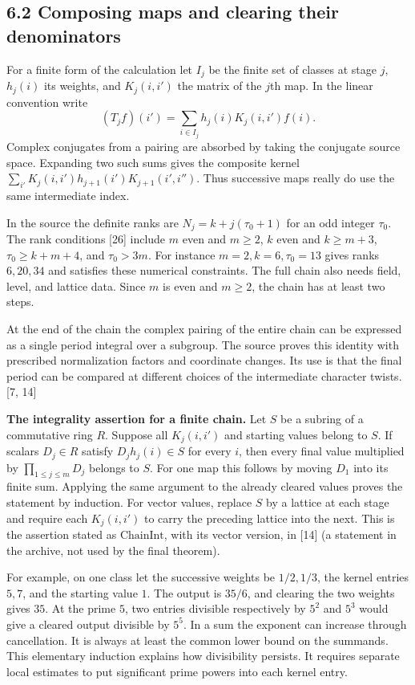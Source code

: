 \documentclass[11pt,letterpaper]{article}
\begin{document}
{\newpage
\subsection*{6.2 Composing maps and clearing their denominators}

For a finite form of the calculation let $I_j$ be the finite set of classes at stage $j$, $h_j(i)$ its weights, and $K_j(i,i')$ the matrix of the $j$th map. In the linear convention write
\begin{equation}\label{D:80}
 (T_j f)(i')=\sum_{i\in I_j} h_j(i)K_j(i,i')f(i).
\end{equation}
Complex conjugates from a pairing are absorbed by taking the conjugate source space. Expanding two such sums gives the composite kernel $\sum_{i'}K_j(i,i')h_{j+1}(i')K_{j+1}(i',i'')$. Thus successive maps really do use the same intermediate index.

In the source the definite ranks are $N_j=k+j(\tau_0+1)$ for an odd integer $\tau_0$. The rank conditions [26] include $m$ even and $m\ge2$, $k$ even and $k\ge m+3$, $\tau_0\ge k+m+4$, and $\tau_0>3m$. For instance $m=2,k=6,\tau_0=13$ gives ranks $6,20,34$ and satisfies these numerical constraints. The full chain also needs field, level, and lattice data. Since $m$ is even and $m\ge2$, the chain has at least two steps.

At the end of the chain the complex pairing of the entire chain can be expressed as a single period integral over a subgroup. The source proves this identity with prescribed normalization factors and coordinate changes. Its use is that the final period can be compared at different choices of the intermediate character twists. [7, 14]

\textbf{The integrality assertion for a finite chain.} Let $S$ be a subring of a commutative ring $R$. Suppose all $K_j(i,i')$ and starting values belong to $S$. If scalars $D_j\in R$ satisfy $D_j h_j(i)\in S$ for every $i$, then every final value multiplied by $\prod_{1\le j\le m}D_j$ belongs to $S$. For one map this follows by moving $D_1$ into its finite sum. Applying the same argument to the already cleared values proves the statement by induction. For vector values, replace $S$ by a lattice at each stage and require each $K_j(i,i')$ to carry the preceding lattice into the next. This is the assertion stated as $\mathrm{ChainInt}$, with its vector version, in [14] (a statement in the archive, not used by the final theorem).

For example, on one class let the successive weights be $1/2,1/3$, the kernel entries $5,7$, and the starting value $1$. The output is $35/6$, and clearing the two weights gives $35$. At the prime $5$, two entries divisible respectively by $5^2$ and $5^3$ would give a cleared output divisible by $5^5$. In a sum the exponent can increase through cancellation. It is always at least the common lower bound on the summands. This elementary induction explains how divisibility persists. It requires separate local estimates to put significant prime powers into each kernel entry.

}
\end{document}
